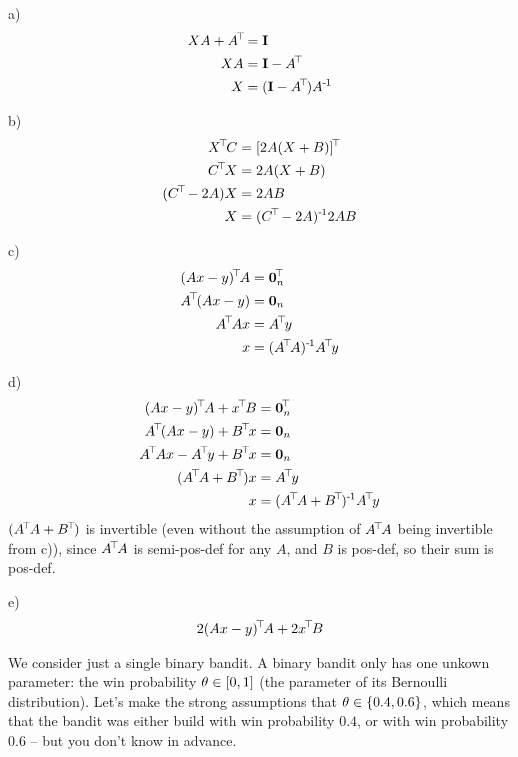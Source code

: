 \begin{solution}
	a)
	\begin{align}
	X A + A^{\!\top\!} &= {\rm\bf I} \\
	X A  &= {\rm\bf I} - A^{\!\top\!} \\
    X &= ({\rm\bf I} - A^{\!\top\!}) A^{{\hspace*{-.0pt}\text{\rm -}\hspace*{-.5pt}}1}
	\end{align}
	
	b)
	\begin{align}
	X^\T C &= [2 A (X + B)]^\T \\
	C^\T X &= 2 A (X + B) \\
	(C^\T - 2A) X &= 2 A B \\
	X &= (C^\T - 2A)^\1 2 A B
	\end{align}
	
	c)
	\begin{align}
	(A x - y)^\T A &= \vec 0_n^\T \\
	A^\T (A x - y) &= \vec 0_n \\
	A^\T A x  &= A^\T y\\
	x  &= (A^\T A)^\1 A^\T y
	\end{align}
	
	d)
	\begin{align}
	(A x - y)^\T A + x^\T B &= \vec 0_n^\T \\
	A^\T (A x - y) + B^\T x &= \vec 0_n \\
	A^\T A x - A^\T y + B^\T x &= \vec 0_n \\
	(A^\T A +B^\T) x &= A^\T y \\
	x &= (A^\T A + B^\T)^\1 A^\T y
	\end{align}
	$(A^{\!\top\!} A + B^{\!\top\!})$ is invertible (even without the assumption of $A^{\!\top\!} A$ being invertible from c)), since $A^{\!\top\!} A$ is semi-pos-def for any $A$, and $B$ is pos-def, so their sum is pos-def.
	
	e)
	\begin{align}
		2(Ax-y)^{\!\top\!} A + 2x^{\!\top\!} B
	\end{align}
\end{solution}



We consider just a single binary bandit. A binary bandit only has one unkown parameter: the win probability $\theta \in [0,1]$ (the parameter of its Bernoulli distribution). Let's make the strong assumptions that $\theta \in \{0.4, 0.6\}$, which means that the bandit was either build with win probability $0.4$, or with win probability $0.6$ -- but you don't know in advance.


